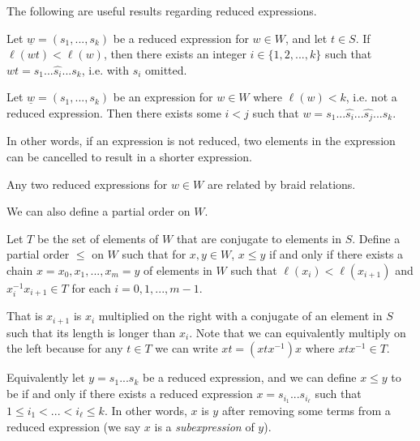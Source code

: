 The following are useful results regarding reduced expressions. %

\begin{theorem}
    Let $\underline{w} = (s_1, ..., s_k)$ be a reduced expression for $w \in W$, and let $t \in S$. If $\ell(wt) < \ell(w)$, then there exists an integer $i \in \{1,2,...,k\}$ such that $wt = s_1 ... \hat{s_i} ... s_k$, i.e. with $s_i$ omitted.
\end{theorem}


\begin{corollary}
    Let $\underline{w} = (s_1, ..., s_k)$ be an expression for $w \in W$ where $\ell(w) < k$, i.e. not a reduced expression. Then there exists some $i < j$ such that $w = s_1 ... \hat{s_i} ... \hat{s_j} ... s_k$.
\end{corollary}

In other words, if an expression is not reduced, two elements in the expression can be cancelled to result in a shorter expression.


\begin{theorem}[Matsumoto, 1964]\label{thm-matsumoto}
    Any two reduced expressions for $w \in W$ are related by braid relations.
\end{theorem}


We can also define a partial order on $W$.

\begin{definition}
    Let $T$ be the set of elements of $W$ that are conjugate to elements in $S$. Define a partial order $\leq$ on $W$ such that for $x,y \in W$, $x \leq y$ if and only if there exists a chain $x=x_0,x_1,...,x_m=y$ of elements in $W$ such that $\ell(x_i) < \ell(x_{i+1})$ and $x_i^{-1} x_{i+1} \in T$ for each $i = 0,1,...,m-1$.
\end{definition}

That is $x_{i+1}$ is $x_i$ multiplied on the right with a conjugate of an element in $S$ such that its length is longer than $x_i$. Note that we can equivalently multiply on the left because for any $t \in T$ we can write $xt = (xtx^{-1})x$ where $xtx^{-1} \in T$.


Equivalently let $y = s_1 ... s_k$ be a reduced expression, and we can define $x \leq y$ to be if and only if there exists a reduced expression $x = s_{i_1} ... s_{i_\ell}$ such that $1 \leq i_1 < ... < i_\ell \leq k$. In other words, $x$ is $y$ after removing some terms from a reduced expression (we say $x$ is a \textit{subexpression} of $y$).

